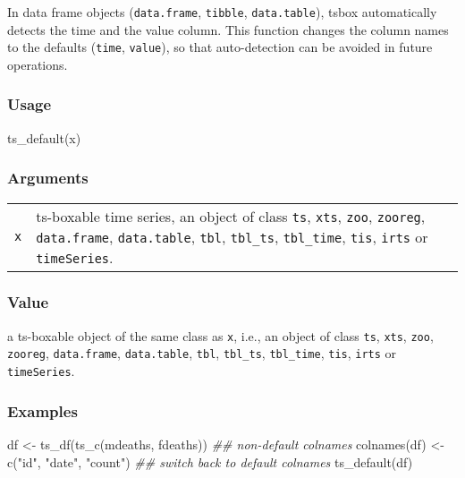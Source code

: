 \documentclass[
  letterpaper,
  DIV=11,
  numbers=noendperiod]{scrreport}
\newenvironment{Shaded}{\begin{snugshade}}{\end{snugshade}}
\newcommand{\DocumentationTok}[1]{\textcolor[rgb]{0.37,0.37,0.37}{\textit{#1}}}
\newcommand{\FunctionTok}[1]{\textcolor[rgb]{0.28,0.35,0.67}{#1}}
\newcommand{\NormalTok}[1]{\textcolor[rgb]{0.00,0.23,0.31}{#1}}
\newcommand{\OtherTok}[1]{\textcolor[rgb]{0.00,0.23,0.31}{#1}}
\newcommand{\StringTok}[1]{\textcolor[rgb]{0.13,0.47,0.30}{#1}}
\begin{document}
In data frame objects (\texttt{data.frame}, \texttt{tibble},
\texttt{data.table}), tsbox automatically detects the time and the value
column. This function changes the column names to the defaults
(\texttt{time}, \texttt{value}), so that auto-detection can be avoided
in future operations.

\subsubsection{Usage}\label{usage-56}

\begin{Shaded}
\begin{Highlighting}[]
\FunctionTok{ts\_default}\NormalTok{(x)}
\end{Highlighting}
\end{Shaded}

\subsubsection{Arguments}\label{arguments-56}

\begin{longtable}[]{@{}ll@{}}
\toprule\noalign{}
\endhead
\bottomrule\noalign{}
\endlastfoot
\texttt{x} & ts-boxable time series, an object of class \texttt{ts},
\texttt{xts}, \texttt{zoo}, \texttt{zooreg}, \texttt{data.frame},
\texttt{data.table}, \texttt{tbl}, \texttt{tbl\_ts}, \texttt{tbl\_time},
\texttt{tis}, \texttt{irts} or \texttt{timeSeries}. \\
\end{longtable}

\subsubsection{Value}\label{value-56}

a ts-boxable object of the same class as \texttt{x}, i.e., an object of
class \texttt{ts}, \texttt{xts}, \texttt{zoo}, \texttt{zooreg},
\texttt{data.frame}, \texttt{data.table}, \texttt{tbl},
\texttt{tbl\_ts}, \texttt{tbl\_time}, \texttt{tis}, \texttt{irts} or
\texttt{timeSeries}.

\subsubsection{Examples}\label{examples-56}

\begin{Shaded}
\begin{Highlighting}[]
\NormalTok{df }\OtherTok{\textless{}{-}} \FunctionTok{ts\_df}\NormalTok{(}\FunctionTok{ts\_c}\NormalTok{(mdeaths, fdeaths))}
\DocumentationTok{\#\# non{-}default colnames}
\FunctionTok{colnames}\NormalTok{(df) }\OtherTok{\textless{}{-}} \FunctionTok{c}\NormalTok{(}\StringTok{"id"}\NormalTok{, }\StringTok{"date"}\NormalTok{, }\StringTok{"count"}\NormalTok{)}
\DocumentationTok{\#\# switch back to default colnames}
\FunctionTok{ts\_default}\NormalTok{(df)}
\end{Highlighting}
\end{Shaded}
\end{document}
